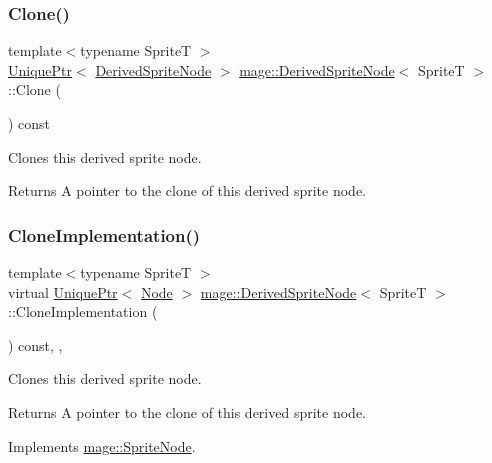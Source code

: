 \subsubsection{\texorpdfstring{Clone()}{Clone()}}
{\footnotesize\ttfamily template$<$typename SpriteT $>$ \\
\hyperlink{namespacemage_a3316d7143a973e37adf1110f2e80ca31}{Unique\+Ptr}$<$ \hyperlink{classmage_1_1_derived_sprite_node}{Derived\+Sprite\+Node} $>$ \hyperlink{classmage_1_1_derived_sprite_node}{mage\+::\+Derived\+Sprite\+Node}$<$ SpriteT $>$\+::Clone (\begin{DoxyParamCaption}{ }\end{DoxyParamCaption}) const}

Clones this derived sprite node.

\begin{DoxyReturn}{Returns}
A pointer to the clone of this derived sprite node. 
\end{DoxyReturn}
\hypertarget{classmage_1_1_derived_sprite_node_ae1aa2b80d4ff8688635df017826c11a5}{}\label{classmage_1_1_derived_sprite_node_ae1aa2b80d4ff8688635df017826c11a5} 
\subsubsection{\texorpdfstring{Clone\+Implementation()}{CloneImplementation()}}
{\footnotesize\ttfamily template$<$typename SpriteT $>$ \\
virtual \hyperlink{namespacemage_a3316d7143a973e37adf1110f2e80ca31}{Unique\+Ptr}$<$ \hyperlink{classmage_1_1_node}{Node} $>$ \hyperlink{classmage_1_1_derived_sprite_node}{mage\+::\+Derived\+Sprite\+Node}$<$ SpriteT $>$\+::Clone\+Implementation (\begin{DoxyParamCaption}{ }\end{DoxyParamCaption}) const\hspace{0.3cm}{\ttfamily [override]}, {\ttfamily [private]}, {\ttfamily [virtual]}}

Clones this derived sprite node.

\begin{DoxyReturn}{Returns}
A pointer to the clone of this derived sprite node. 
\end{DoxyReturn}


Implements \hyperlink{classmage_1_1_sprite_node_a83a2a865b38670d64491a1066895e218}{mage\+::\+Sprite\+Node}.

